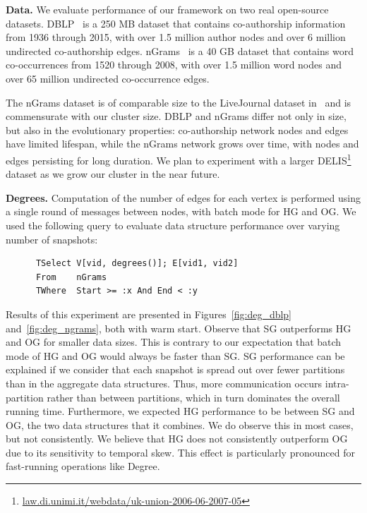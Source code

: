 {\bf Data.}  We evaluate performance of our framework on two real
open-source datasets.
DBLP~\cite{dblp} is a 250 MB dataset that contains co-authorship
information from 1936 through 2015, with over 1.5 million author nodes
and over 6 million undirected co-authorship edges. 
%
nGrams~\cite{nGrams} is a 40 GB dataset that contains word
co-occurrences from 1520 through 2008, with over 1.5 million word
nodes and over 65 million undirected co-occurrence edges.

The nGrams dataset is of comparable size to the LiveJournal dataset
in~\cite{Xin2013} and is commensurate with our cluster size.  DBLP and
nGrams differ not only in size, but also in the evolutionary
properties: co-authorship network nodes and edges have limited
lifespan, while the nGrams network grows over time, with nodes and
edges persisting for long duration.  
We plan to experiment with a larger
DELIS\footnote{\url{law.di.unimi.it/webdata/uk-union-2006-06-2007-05}}
dataset as we grow our cluster in the near future.


{\bf Degrees.} Computation of the number of edges for each vertex is
performed using a single round of messages between nodes, with batch
mode for HG and OG.  We used the following query to evaluate data
structure performance over varying number of snapshots:

\begin{small}
\begin{verbatim}
      TSelect V[vid, degrees()]; E[vid1, vid2]
      From    nGrams
      TWhere  Start >= :x And End < :y
\end{verbatim}
\end{small}

Results of this experiment are presented in Figures~\ref{fig:deg_dblp}
and~\ref{fig:deg_ngrams}, both with warm start.  Observe that SG
outperforms HG and OG for smaller data sizes.  This is contrary to our
expectation that batch mode of HG and OG would always be faster than
SG.  SG performance can be explained if we consider that each snapshot
is spread out over fewer partitions than in the aggregate data
structures.  Thus, more communication occurs intra-partition rather
than between partitions, which in turn dominates the overall running
time.  Furthermore, we expected HG performance to be between SG and
OG, the two data structures that it combines.  We do observe this in
most cases, but not consistently.  We believe that HG does not
consistently outperform OG due to its sensitivity to temporal skew.
This effect is particularly pronounced for fast-running operations
like Degree.

